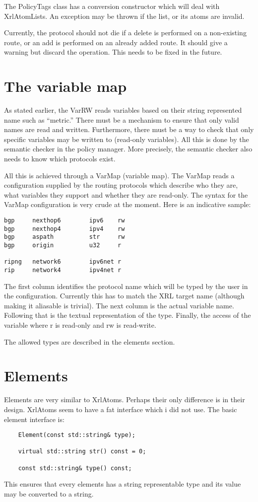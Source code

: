 \documentclass{article}
\begin{document}
The PolicyTags class has a conversion constructor which will deal with
XrlAtomLists. An exception may be thrown if the list, or its atoms are invalid.

Currently, the protocol should not die if a delete is performed on a
non-existing route, or an add is performed on an already added route. It should
give a warning but discard the operation. This needs to be fixed in the future.

\section{\label{varmap}The variable map}
As stated earlier, the VarRW reads variables based on their string represented
name such as ``metric.'' There must be a mechanism to ensure that only valid
names are read and written. Furthermore, there must be a way to check that only
specific variables may be written to (read-only variables). All this is done by
the semantic checker in the policy manager. More precisely, the semantic checker
also needs to know which protocols exist.

All this is achieved through a VarMap (variable map). The VarMap reads a
configuration supplied by the routing protocols which describe who they are, 
what variables they support and whether they are read-only. The syntax for the
VarMap configuration is very crude at the moment. Here is an indicative sample:
\begin{verbatim}
bgp     nexthop6        ipv6    rw
bgp     nexthop4        ipv4    rw
bgp     aspath          str     rw
bgp     origin          u32     r

ripng   network6        ipv6net r
rip     network4        ipv4net r
\end{verbatim}
The first column identifies the protocol name which will be typed by the user in
the configuration. Currently this has to match the XRL target name (although
making it aliasable is trivial). The next column is the actual variable name.
Following that is the textual representation of the type. Finally, the access of
the variable where r is read-only and rw is read-write.

The allowed types are described in the elements section.

\section{\label{elems}Elements}
Elements are very similar to XrlAtoms. Perhaps their only difference is in their
design. XrlAtoms seem to have a fat interface which i did not use. The basic
element interface is:
\begin{verbatim}
    Element(const std::string& type);
    
    virtual std::string str() const = 0;

    const std::string& type() const;
\end{verbatim}
This ensures that every elements has a string representable type and its value
may be converted to a string. 
\end{document}
